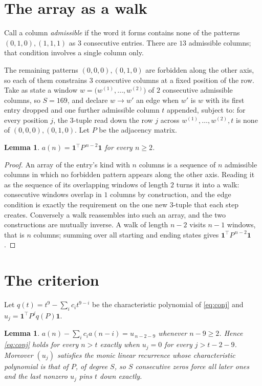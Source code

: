 \documentclass[11pt,a4paper]{article}
\theoremstyle{plain}
\newtheorem{lemma}[theorem]{Lemma}
\theoremstyle{definition}
\begin{document}
\section{The array as a walk}

Call a column \emph{admissible} if the word it forms contains none of the patterns
$(0,1,0), (1,1,1)$ as $3$ consecutive entries. There are $13$ admissible columns; that condition
involves a single column only.

The remaining patterns $(0,0,0), (0,1,0)$ are forbidden along the other axis, so each of them
constrains $3$ consecutive columns at a fixed position of the row. Take as state a
window $w=\bigl(w^{(1)},\dots,w^{(2)}\bigr)$ of $2$ consecutive admissible
columns, so $S=169$, and declare $w\to w'$ an edge when $w'$ is $w$ with its first entry
dropped and one further admissible column $t$ appended, subject to: for every position
$j$, the $3$-tuple read down the row $j$ across $w^{(1)},\dots,w^{(2)},t$
is none of $(0,0,0), (0,1,0)$. Let $P$ be the adjacency matrix.

\begin{lemma}\label{lem:walk}
$a(n)=\mathbf{1}^{\!\top}P^{\,n-2}\mathbf{1}$ for every $n\ge2$.
\end{lemma}

\begin{proof}
An array of the entry's kind with $n$ columns is a sequence of $n$ admissible columns in
which no forbidden pattern appears along the other axis. Reading it as the sequence of its
overlapping windows of length $2$ turns it into a walk: consecutive windows overlap in
$1$ columns by construction, and the edge condition is exactly the requirement on the one
new $3$-tuple that each step creates. Conversely a walk reassembles into such an array,
and the two constructions are mutually inverse. A walk of length $n-2$ visits $n-1$
windows, that is $n$ columns; summing over all starting and ending states gives
$\mathbf{1}^{\!\top}P^{\,n-2}\mathbf{1}$.
\end{proof}

\section{The criterion}

Let $q(t)=t^{9}-\sum_i c_i t^{9-i}$ be the characteristic polynomial of
\eqref{eq:conj} and $u_j=\mathbf{1}^{\!\top}P^{j}q(P)\mathbf{1}$.

\begin{lemma}\label{lem:crit}
$a(n)-\sum_i c_i a(n-i)=u_{\,n-2-9}$ whenever $n-9\ge2$. Hence
\eqref{eq:conj} holds for every $n>t$ exactly when $u_j=0$ for every
$j>t-2-9$. Moreover $(u_j)$ satisfies the monic linear recurrence whose
characteristic polynomial is that of $P$, of degree $S$, so $S$ consecutive zeros force all
later ones and the last nonzero $u_j$ pins $t$ down exactly.
\end{lemma}
\end{document}
